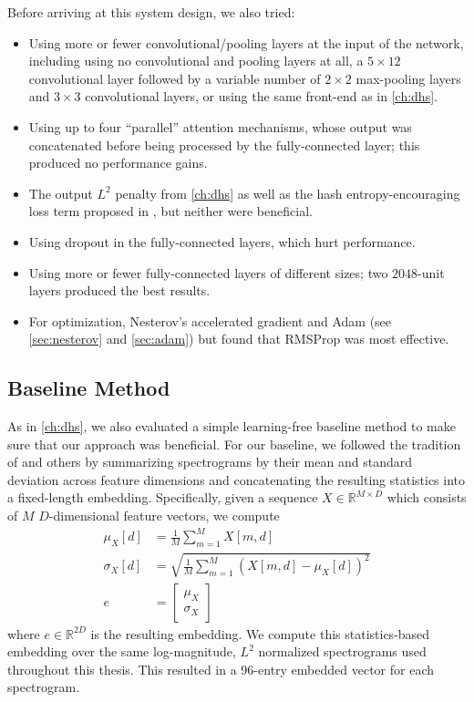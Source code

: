 Before arriving at this system design, we also tried:
\begin{itemize}
\item Using more or fewer convolutional/pooling layers at the input of the network, including using no convolutional and pooling layers at all, a $5 \times 12$ convolutional layer followed by a variable number of $2 \times 2$ max-pooling layers and $3 \times 3$ convolutional layers, or using the same front-end as in \cref{ch:dhs}.
\item Using up to four ``parallel'' attention mechanisms, whose output was concatenated before being processed by the fully-connected layer; this produced no performance gains.
\item The output $L^2$ penalty from \cref{ch:dhs} as well as the hash entropy-encouraging loss term proposed in \cite[equation (3)]{yang2015supervised}, but neither were beneficial.
\item Using dropout in the fully-connected layers, which hurt performance.
\item Using more or fewer fully-connected layers of different sizes; two $2048$-unit layers produced the best results.
\item For optimization, Nesterov's accelerated gradient \cite{nesterov1983method} and Adam \cite{kingma2015adam} (see \cref{sec:nesterov} and \cref{sec:adam}) but found that RMSProp was most effective.
\end{itemize}

\subsection{Baseline Method}
\label{sec:embedding_baseline}

As in \cref{ch:dhs}, we also evaluated a simple learning-free baseline method to make sure that our approach was beneficial.
For our baseline, we followed the tradition of \cite{tzanetakis2002musical, deng2008study, mandel2005song, foster2014sequential} and others by summarizing spectrograms by their mean and standard deviation across feature dimensions and concatenating the resulting statistics into a fixed-length embedding.
Specifically, given a sequence $X \in \mathbb{R}^{M \times D}$ which consists of $M$ $D$-dimensional feature vectors, we compute
\begin{align}
\mu_X[d] &= \frac{1}{M} \sum_{m = 1}^M X[m, d]\\
\sigma_X[d] &= \sqrt{\frac{1}{M} \sum_{m = 1}^M (X[m, d] - \mu_X[d])^2}\\
e &= \begin{bmatrix}
\mu_X\\
\sigma_X
\end{bmatrix}
\end{align}
where $e \in \mathbb{R}^{2D}$ is the resulting embedding.
We compute this statistics-based embedding over the same log-magnitude, $L^2$ normalized spectrograms used throughout this thesis.
This resulted in a 96-entry embedded vector for each spectrogram.

